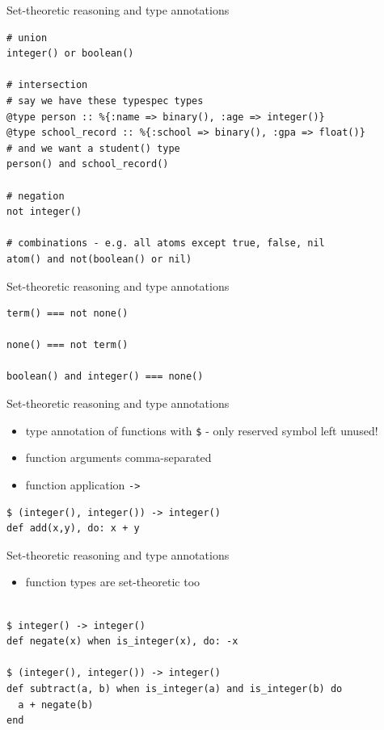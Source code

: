 \documentclass[
  ignorenonframetext,
  aspectratio=169]{beamer}
\newcommand{\passthrough}[1]{#1}
\providecommand{\tightlist}{%
  \setlength{\itemsep}{0pt}\setlength{\parskip}{0pt}}
\begin{document}
\begin{frame}[fragile]{Set-theoretic reasoning and type annotations}
\label{set-theoretic-reasoning-and-type-annotations-2}
\begin{lstlisting}
# union
integer() or boolean()

# intersection
# say we have these typespec types
@type person :: %{:name => binary(), :age => integer()}
@type school_record :: %{:school => binary(), :gpa => float()}
# and we want a student() type
person() and school_record()

# negation
not integer()

# combinations - e.g. all atoms except true, false, nil
atom() and not(boolean() or nil)
\end{lstlisting}
\end{frame}

\begin{frame}[fragile]{Set-theoretic reasoning and type annotations}
\label{set-theoretic-reasoning-and-type-annotations-3}
\begin{lstlisting}
term() === not none()

none() === not term()

boolean() and integer() === none()
\end{lstlisting}
\end{frame}

\begin{frame}[fragile]{Set-theoretic reasoning and type annotations}
\label{set-theoretic-reasoning-and-type-annotations-4}
\begin{itemize}
\tightlist
\item
  type annotation of functions with \passthrough{\lstinline!$!} - only
  reserved symbol left unused!
\item
  function arguments comma-separated
\item
  function application \passthrough{\lstinline!->!}
\end{itemize}

\begin{lstlisting}
$ (integer(), integer()) -> integer()
def add(x,y), do: x + y
\end{lstlisting}
\end{frame}

\begin{frame}[fragile]{Set-theoretic reasoning and type annotations}
\label{set-theoretic-reasoning-and-type-annotations-5}
\begin{itemize}
\tightlist
\item
  function types are set-theoretic too
\end{itemize}

\begin{lstlisting}

$ integer() -> integer()
def negate(x) when is_integer(x), do: -x

$ (integer(), integer()) -> integer()
def subtract(a, b) when is_integer(a) and is_integer(b) do
  a + negate(b)
end
\end{lstlisting}
\end{frame}
\end{document}

